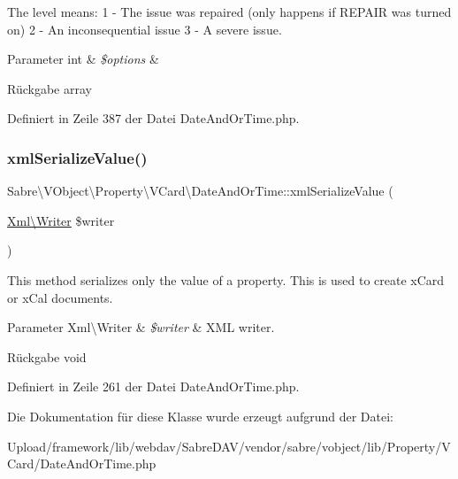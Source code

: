 The level means\+: 1 -\/ The issue was repaired (only happens if R\+E\+P\+A\+IR was turned on) 2 -\/ An inconsequential issue 3 -\/ A severe issue.


\begin{DoxyParams}[1]{Parameter}
int & {\em \$options} & \\
\hline
\end{DoxyParams}
\begin{DoxyReturn}{Rückgabe}
array 
\end{DoxyReturn}


Definiert in Zeile 387 der Datei Date\+And\+Or\+Time.\+php.

\mbox{\label{class_sabre_1_1_v_object_1_1_property_1_1_v_card_1_1_date_and_or_time_a22d0a4ce399a76c19bd54114042cdc4a}} 
\subsubsection{\texorpdfstring{xml\+Serialize\+Value()}{xmlSerializeValue()}}
{\footnotesize\ttfamily Sabre\textbackslash{}\+V\+Object\textbackslash{}\+Property\textbackslash{}\+V\+Card\textbackslash{}\+Date\+And\+Or\+Time\+::xml\+Serialize\+Value (\begin{DoxyParamCaption}\item[{\mbox{\hyperlink{class_sabre_1_1_xml_1_1_writer}{Xml\textbackslash{}\+Writer}}}]{\$writer }\end{DoxyParamCaption})\hspace{0.3cm}{\ttfamily [protected]}}

This method serializes only the value of a property. This is used to create x\+Card or x\+Cal documents.


\begin{DoxyParams}[1]{Parameter}
Xml\textbackslash{}\+Writer & {\em \$writer} & X\+ML writer.\\
\hline
\end{DoxyParams}
\begin{DoxyReturn}{Rückgabe}
void 
\end{DoxyReturn}


Definiert in Zeile 261 der Datei Date\+And\+Or\+Time.\+php.



Die Dokumentation für diese Klasse wurde erzeugt aufgrund der Datei\+:\begin{DoxyCompactItemize}
\item 
Upload/framework/lib/webdav/\+Sabre\+D\+A\+V/vendor/sabre/vobject/lib/\+Property/\+V\+Card/Date\+And\+Or\+Time.\+php\end{DoxyCompactItemize}
